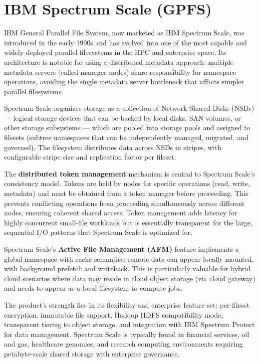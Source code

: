 \section{IBM Spectrum Scale (GPFS)}
IBM General Parallel File System, now marketed as IBM Spectrum Scale, was introduced in the early 1990s and has evolved into one of the most capable and widely deployed parallel filesystems in the HPC and enterprise space. Its architecture is notable for using a distributed metadata approach: multiple metadata servers (called manager nodes) share responsibility for namespace operations, avoiding the single metadata server bottleneck that afflicts simpler parallel filesystems.

Spectrum Scale organizes storage as a collection of Network Shared Disks (NSDs) --- logical storage devices that can be backed by local disks, SAN volumes, or other storage subsystems --- which are pooled into storage pools and assigned to filesets (subtree namespaces that can be independently managed, migrated, and governed). The filesystem distributes data across NSDs in stripes, with configurable stripe size and replication factor per fileset.

The \textbf{distributed token management} mechanism is central to Spectrum Scale's consistency model. Tokens are held by nodes for specific operations (read, write, metadata) and must be obtained from a token manager before proceeding. This prevents conflicting operations from proceeding simultaneously across different nodes, ensuring coherent shared access. Token management adds latency for highly concurrent small-file workloads but is essentially transparent for the large, sequential I/O patterns that Spectrum Scale is optimized for.

Spectrum Scale's \textbf{Active File Management (AFM)} feature implements a global namespace with cache semantics: remote data can appear locally mounted, with background prefetch and writeback. This is particularly valuable for hybrid cloud scenarios where data may reside in cloud object storage (via cloud gateway) and needs to appear as a local filesystem to compute jobs.

The product's strength lies in its flexibility and enterprise feature set: per-fileset encryption, immutable file support, Hadoop HDFS compatibility mode, transparent tiering to object storage, and integration with IBM Spectrum Protect for data management. Spectrum Scale is typically found in financial services, oil and gas, healthcare genomics, and research computing environments requiring petabyte-scale shared storage with enterprise governance.

